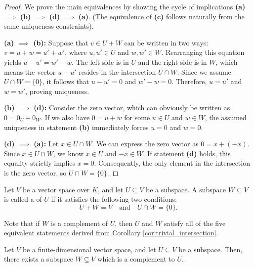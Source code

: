 \begin{proof}
We prove the main equivalences by showing the cycle of implications \textbf{(a)} $\implies$ \textbf{(b)} $\implies$ \textbf{(d)} $\implies$ \textbf{(a)}. (The equivalence of \textbf{(c)} follows naturally from the same uniqueness constraints).

\textbf{(a) $\implies$ (b):} Suppose that $v \in U + W$ can be written in two ways: $v = u + w = u' + w'$, where $u, u' \in U$ and $w, w' \in W$. Rearranging this equation yields $u - u' = w' - w$. The left side is in $U$ and the right side is in $W$, which means the vector $u - u'$ resides in the intersection $U \cap W$. Since we assume $U \cap W = \{0\}$, it follows that $u - u' = 0$ and $w' - w = 0$. Therefore, $u = u'$ and $w = w'$, proving uniqueness.

\textbf{(b) $\implies$ (d):} Consider the zero vector, which can obviously be written as $0 = 0_U + 0_W$. If we also have $0 = u + w$ for some $u \in U$ and $w \in W$, the assumed uniqueness in statement \textbf{(b)} immediately forces $u = 0$ and $w = 0$.

\textbf{(d) $\implies$ (a):} Let $x \in U \cap W$. We can express the zero vector as $0 = x + (-x)$. Since $x \in U \cap W$, we know $x \in U$ and $-x \in W$. If statement \textbf{(d)} holds, this equality strictly implies $x = 0$. Consequently, the only element in the intersection is the zero vector, so $U \cap W = \{0\}$.
\end{proof}

\setcounter{theorem}{3} %

\begin{definition}
\label{def:complement}
Let $V$ be a vector space over $K$, and let $U \subseteq V$ be a subspace. A subspace $W \subseteq V$ is called a  of $U$ if it satisfies the following two conditions:
\[
U + W = V \quad \text{and} \quad U \cap W = \{0\}.
\]
\end{definition}

\begin{remark}
Note that if $W$ is a complement of $U$, then $U$ and $W$ satisfy all of the five equivalent statements derived from Corollary \ref{cor:trivial_intersection}.
\end{remark}

\begin{proposition}
\label{prop:existence_complement}
Let $V$ be a finite-dimensional vector space, and let $U \subseteq V$ be a subspace. Then, there exists a subspace $W \subseteq V$ which is a complement to $U$.
\end{proposition}

